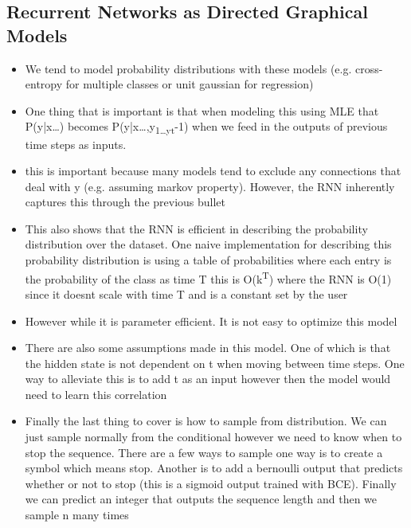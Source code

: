 \documentclass[11pt]{article}
\begin{document}
\subsection{Recurrent Networks as Directed Graphical Models}
\label{sec:orga1c591f}
\begin{itemize}
\item We tend to model probability distributions with these models (e.g. cross-entropy for multiple classes or unit gaussian for regression)
\item One thing that is important is that when modeling this using MLE that P(y|x\ldots{}) becomes P(y|x\ldots{},y\textsubscript{1\ldots{}y}\textsubscript{t}-1) when we feed in the outputs of previous time steps as inputs.
\item this is important because many models tend to exclude any connections that deal with y (e.g. assuming markov property). However, the RNN inherently captures this through the previous bullet
\item This also shows that the RNN is efficient in describing the probability distribution over the dataset. One naive implementation for describing this probability distribution is using a table of probabilities where each entry is the probability of the class as time T this is O(k\textsuperscript{T}) where the RNN is O(1) since it doesnt scale with time T and is a constant set by the user
\item However while it is parameter efficient. It is not easy to optimize this model
\item There are also some assumptions made in this model. One of which is that the hidden state is not dependent on t when moving between time steps. One way to alleviate this is to add t as an input however then the model would need to learn this correlation
\item Finally the last thing to cover is how to sample from distribution. We can just sample normally from the conditional however we need to know when to stop the sequence. There are a few ways to sample one way is to create a symbol which means stop. Another is to add a bernoulli output that predicts whether or not to stop (this is a sigmoid output trained with BCE). Finally we can predict an integer that outputs the sequence length and then we sample n many times
\end{itemize}
\end{document}
